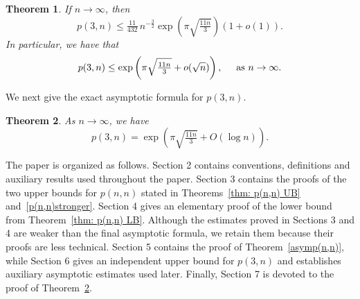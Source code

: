 \documentclass[12pt,a4paper]{amsart}
\numberwithin{equation}{section}
\theoremstyle{plain}
\newtheorem{thm}{Theorem}[section]
\theoremstyle{definition}
\theoremstyle{remark}
\begin{document}



\begin{thm}\label{thmp(3n)UB}
If $n\to\infty$, then
$$
p(3,n)
\le
\tfrac{11}{432}\,
n^{-\frac{3}{2}}
\exp\left(\pi\sqrt{\tfrac{11n}{3}}\right)
(1+o(1)).
$$
In particular, we have that
$$
p(3,n)
\le
\exp\left(
\pi\sqrt{\tfrac{11n}{3}}+o(\sqrt n)
\right),\hspace{0.5cm}\text{as }n\to\infty.
$$
\end{thm}

We next give the exact asymptotic formula for $p(3,n)$.


\begin{thm}\label{thm: asymptotic p(3,n)}
As $n\to\infty$, we have
$$
p(3,n)
=
\exp\left(
\pi\sqrt{\tfrac{11n}{3}}+O(\log n)
\right).
$$
\end{thm}

The paper is organized as follows. Section 2 contains conventions, definitions and auxiliary results used throughout the paper. Section 3 contains the proofs of the two upper bounds for $p(n,n)$ stated in Theorems~\ref{thm: p(n,n) UB} and~\ref{p(n,n)stronger}. Section 4 gives an elementary proof of the lower bound from Theorem~\ref{thm: p(n,n) LB}. Although the estimates proved in Sections 3 and 4 are weaker than the final asymptotic formula, we retain them because their proofs are less technical. Section 5 contains the proof of Theorem~\ref{asymp(n,n)}, while Section 6 gives an independent upper bound for $p(3,n)$ and establishes auxiliary asymptotic estimates used later. Finally, Section 7 is devoted to the proof of Theorem~\ref{thm: asymptotic p(3,n)}.
\end{document}
